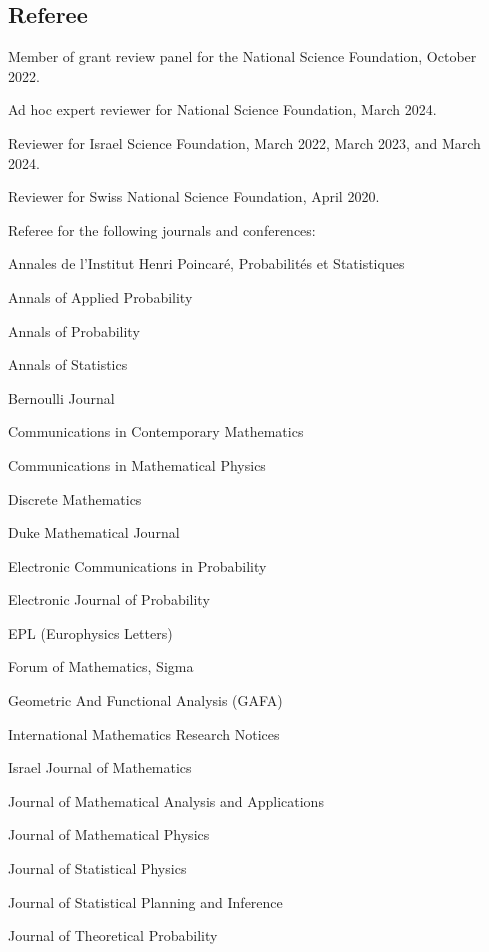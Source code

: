 \documentclass[letterpaper]{article}
\renewenvironment{itemize}{
  \begin{list}{}{
    \setlength{\leftmargin}{1em}
  }
}{
  \end{list}
}
\begin{document}
\subsection*{Referee} 
\begin{itemize}
	\item Member of grant review panel for the National Science Foundation, October 2022. 
	\item Ad hoc expert reviewer for National Science Foundation, March 2024. 
	\item Reviewer for Israel Science Foundation, March 2022, March 2023, and March 2024.  
	\item Reviewer for Swiss National Science Foundation, April 2020.  
	\item Referee for the following journals and conferences: 
	\begin{itemize}
		\item Annales de l'Institut Henri Poincar\'{e}, Probabilit\'{e}s et Statistiques
		\item Annals of Applied Probability
		\item Annals of Probability
		\item Annals of Statistics
		\item Bernoulli Journal
		\item Communications in Contemporary Mathematics
		\item Communications in Mathematical Physics
		\item Discrete Mathematics
		\item Duke Mathematical Journal
		\item Electronic Communications in Probability
		\item Electronic Journal of Probability
		\item EPL (Europhysics Letters)
		\item Forum of Mathematics, Sigma
		\item Geometric And Functional Analysis (GAFA)
		\item International Mathematics Research Notices
		\item Israel Journal of Mathematics 
		\item Journal of Mathematical Analysis and Applications
		\item Journal of Mathematical Physics
		\item Journal of Statistical Physics
		\item Journal of Statistical Planning and Inference
		\item Journal of Theoretical Probability

\end{itemize}
\end{itemize}
\end{document}

